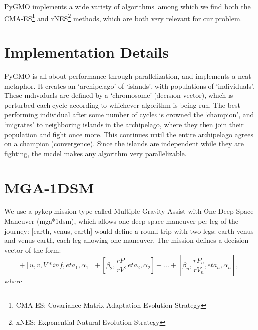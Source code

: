 PyGMO implements a wide variety of algorithms, among which we find both the CMA-ES\footnote{CMA-ES: Covariance Matrix Adaptation Evolution Strategy} and xNES\footnote{xNES: Exponential Natural Evolution Strategy} methods, which are both very relevant for our problem.

\section{Implementation Details} 

PyGMO is all about performance through parallelization, and implements a neat metaphor. It creates an `archipelago' of `islands', with populations of `individuals'. These individuals are defined by a `chromosome' (decision vector), which is perturbed each cycle according to whichever algorithm is being run. The best performing individual after some number of cycles is crowned the `champion', and `migrates' to neighboring islands in the archipelago, where they then join their population and fight once more. This continues until the entire archipelago agrees on a champion (convergence). Since the islands are independent while they are fighting, the model makes any algorithm very parallelizable.

\section{MGA-1DSM}
We use a pykep mission type called Multiple Gravity Assist with One Deep Space Maneuver (mga*1dsm), which allows one deep space maneuver per leg of the journey: [earth, venus, earth] would define a round trip with two legs: earth-venus and venus-earth, each leg allowing one maneuver. The mission defines a decision vector of the form:
\begin{equation}
    [t0, T]+[u,v,V*{inf},eta_1, \alpha_1] + [\beta_2, \frac{rP}{rV},eta_2,\alpha_2]+ ... +[\beta_n,\frac{rP_n}{rV_n},eta_n,\alpha_n] ,
\end{equation}
where 


